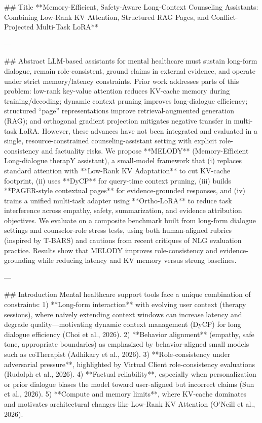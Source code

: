 ## Title  
**Memory-Efficient, Safety-Aware Long-Context Counseling Assistants: Combining Low-Rank KV Attention, Structured RAG Pages, and Conflict-Projected Multi-Task LoRA**

---

## Abstract  
LLM-based assistants for mental healthcare must sustain long-form dialogue, remain role-consistent, ground claims in external evidence, and operate under strict memory/latency constraints. Prior work addresses parts of this problem: low-rank key-value attention reduces KV-cache memory during training/decoding; dynamic context pruning improves long-dialogue efficiency; structured “page” representations improve retrieval-augmented generation (RAG); and orthogonal gradient projection mitigates negative transfer in multi-task LoRA. However, these advances have not been integrated and evaluated in a single, resource-constrained counseling-assistant setting with explicit role-consistency and factuality risks. We propose **MELODY** (Memory-Efficient Long-dialogue therapY assistant), a small-model framework that (i) replaces standard attention with **Low-Rank KV Adaptation** to cut KV-cache footprint, (ii) uses **DyCP** for query-time context pruning, (iii) builds **PAGER-style contextual pages** for evidence-grounded responses, and (iv) trains a unified multi-task adapter using **Ortho-LoRA** to reduce task interference across empathy, safety, summarization, and evidence attribution objectives. We evaluate on a composite benchmark built from long-form dialogue settings and counselor-role stress tests, using both human-aligned rubrics (inspired by T-BARS) and cautions from recent critiques of NLG evaluation practice. Results show that MELODY improves role-consistency and evidence-grounding while reducing latency and KV memory versus strong baselines.

---

## Introduction  
Mental healthcare support tools face a unique combination of constraints:  
1) **Long-form interaction** with evolving user context (therapy sessions), where naïvely extending context windows can increase latency and degrade quality—motivating dynamic context management (DyCP) for long dialogue efficiency (Choi et al., 2026).  
2) **Behavior alignment** (empathy, safe tone, appropriate boundaries) as emphasized by behavior-aligned small models such as coTherapist (Adhikary et al., 2026).  
3) **Role-consistency under adversarial pressure**, highlighted by Virtual Client role-consistency evaluations (Rudolph et al., 2026).  
4) **Factual reliability**, especially when personalization or prior dialogue biases the model toward user-aligned but incorrect claims (Sun et al., 2026).  
5) **Compute and memory limits**, where KV-cache dominates and motivates architectural changes like Low-Rank KV Attention (O’Neill et al., 2026).  

